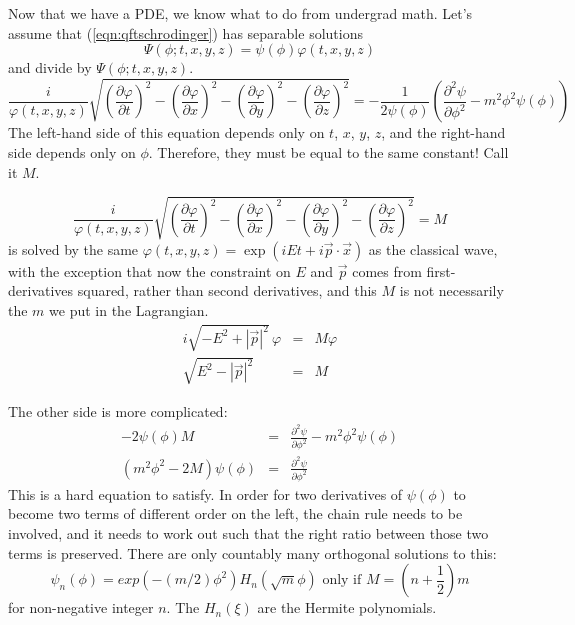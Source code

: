 \documentclass[12pt]{article}
\begin{document}
Now that we have a PDE, we know what to do from undergrad math.  Let's
assume that (\ref{eqn:qftschrodinger}) has separable solutions
\begin{equation}
  \Psi(\phi; t, x, y, z) = \psi(\phi) \varphi(t,x,y,z)
\end{equation}
and divide by $\Psi(\phi; t,x,y,z)$.
\begin{equation}
  \frac{i}{\varphi(t,x,y,z)} \sqrt{\left(\frac{\partial
  \varphi}{\partial t}\right)^2 - \left(\frac{\partial
  \varphi}{\partial x}\right)^2 - \left(\frac{\partial
  \varphi}{\partial y}\right)^2 - \left(\frac{\partial
  \varphi}{\partial z}\right)^2} =
  -\frac{1}{2\psi(\phi)} \left(\frac{\partial^2 \psi}{\partial \phi^2}
  - m^2 \phi^2 \psi(\phi) \right)
\end{equation}
The left-hand side of this equation depends only on $t$, $x$, $y$,
$z$, and the right-hand side depends only on $\phi$.  Therefore, they
must be equal to the same constant!  Call it $M$.

\begin{equation}
  \frac{i}{\varphi(t,x,y,z)} \sqrt{\left(\frac{\partial
  \varphi}{\partial t}\right)^2 - \left(\frac{\partial
  \varphi}{\partial x}\right)^2 - \left(\frac{\partial
  \varphi}{\partial y}\right)^2 - \left(\frac{\partial
  \varphi}{\partial z}\right)^2} = M
\end{equation}
is solved by the same $\varphi(t,x,y,z) = \exp(iEt +
i\vec{p}\cdot\vec{x})$ as the classical wave, with the exception that
now the constraint on $E$ and $\vec{p}$ comes from first-derivatives
squared, rather than second derivatives, and this $M$ is not
necessarily the $m$ we put in the Lagrangian.
\begin{eqnarray}
  i\sqrt{-E^2 + |\vec{p}|^2} \, \varphi &=& M \varphi \\
  \sqrt{E^2 - |\vec{p}|^2} &=& M
\end{eqnarray}

The other side is more complicated:
\begin{eqnarray}
  -2 \psi(\phi) M &=& \frac{\partial^2 \psi}{\partial \phi^2} - m^2 \phi^2 \psi(\phi) \\
  (m^2\phi^2 - 2M) \psi(\phi) &=& \frac{\partial^2 \psi}{\partial \phi^2}
\end{eqnarray}
This is a hard equation to satisfy.  In order for two derivatives of
$\psi(\phi)$ to become two terms of different order on the left, the
chain rule needs to be involved, and it needs to work out such that
the right ratio between those two terms is preserved.  There are only
countably many orthogonal solutions to this:
\begin{equation}
  \psi_n(\phi) = exp(-(m/2) \phi^2) H_n(\sqrt{m} \phi)
  \mbox{ only if } M = \left(n + \frac{1}{2}\right) m
\end{equation}
for non-negative integer $n$.  The $H_n(\xi)$ are the Hermite
polynomials.
\end{document}
